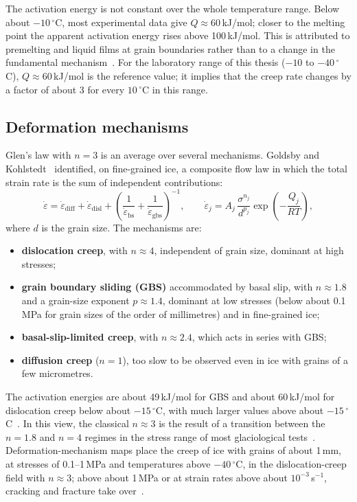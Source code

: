 The activation energy is not constant over the whole temperature range. Below about $-10\,^\circ$C, most experimental data give $Q\approx60$\,kJ/mol; closer to the melting point the apparent activation energy rises above 100\,kJ/mol. This is attributed to premelting and liquid films at grain boundaries rather than to a change in the fundamental mechanism~\cite{cuffey2010,goldsby2001}. For the laboratory range of this thesis ($-10$ to $-40\,^\circ$C), $Q\approx60$\,kJ/mol is the reference value; it implies that the creep rate changes by a factor of about 3 for every $10\,^\circ$C in this range.

\subsection{Deformation mechanisms}

Glen's law with $n = 3$ is an average over several mechanisms. Goldsby and Kohlstedt~\cite{goldsby2001} identified, on fine-grained ice, a composite flow law in which the total strain rate is the sum of independent contributions:
\begin{equation}
    \dot\varepsilon = \dot\varepsilon_{\mathrm{diff}} + \dot\varepsilon_{\mathrm{disl}} + \left(\frac{1}{\dot\varepsilon_{\mathrm{bs}}} + \frac{1}{\dot\varepsilon_{\mathrm{gbs}}}\right)^{-1},
    \qquad
    \dot\varepsilon_j = A_j\,\frac{\sigma^{n_j}}{d^{p_j}}\exp\left(-\frac{Q_j}{RT}\right),
    \label{eq:gk}
\end{equation}
where $d$ is the grain size. The mechanisms are:
\begin{itemize}
    \item \textbf{dislocation creep}, with $n\approx4$, independent of grain size, dominant at high stresses;
    \item \textbf{grain boundary sliding (GBS)} accommodated by basal slip, with $n\approx1.8$ and a grain-size exponent $p\approx1.4$, dominant at low stresses (below about 0.1\,MPa for grain sizes of the order of millimetres) and in fine-grained ice;
    \item \textbf{basal-slip-limited creep}, with $n\approx2.4$, which acts in series with GBS;
    \item \textbf{diffusion creep} ($n = 1$), too slow to be observed even in ice with grains of a few micrometres.
\end{itemize}
The activation energies are about 49\,kJ/mol for GBS and about 60\,kJ/mol for dislocation creep below about $-15\,^\circ$C, with much larger values above about $-15\,^\circ$C~\cite{goldsby2001}. In this view, the classical $n\approx3$ is the result of a transition between the $n = 1.8$ and $n = 4$ regimes in the stress range of most glaciological tests~\cite{goldsby2001,duval2002comment,goldsby2002reply}. Deformation-mechanism maps place the creep of ice with grains of about 1\,mm, at stresses of 0.1--1\,MPa and temperatures above $-40\,^\circ$C, in the dislocation-creep field with $n\approx3$; above about 1\,MPa or at strain rates above about $10^{-3}$\,s$^{-1}$, cracking and fracture take over~\cite{shoji1978,schulson2009}.

